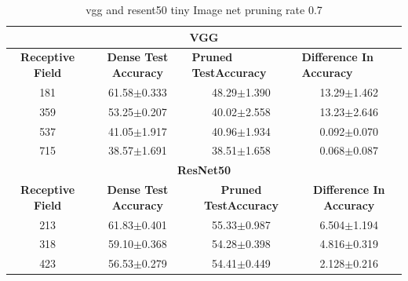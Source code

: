 \begin{table}[]
\begin{tabular}{@{}cccc@{}}
\toprule
\multicolumn{4}{c}{\textbf{VGG}}                                                                                                                                  \\ \midrule
\textbf{Receptive Field} & \textbf{Dense Test Accuracy} & \multicolumn{1}{l}{\textbf{Pruned  TestAccuracy}} & \multicolumn{1}{l}{\textbf{Difference In Accuracy}} \\ \midrule
181                      & 61.58$\pm$0.333              & 48.29$\pm$1.390                                   & 13.29$\pm$1.462                                     \\
359                      & 53.25$\pm$0.207              & 40.02$\pm$2.558                                   & 13.23$\pm$2.646                                     \\
537                      & 41.05$\pm$1.917              & 40.96$\pm$1.934                                   & 0.092$\pm$0.070                                     \\
715                      & 38.57$\pm$1.691              & 38.51$\pm$1.658                                   & 0.068$\pm$0.087                                     \\ \midrule
\multicolumn{4}{c}{\textbf{ResNet50}}                                                                                                                             \\ \midrule
\textbf{Receptive Field} & \textbf{Dense Test Accuracy} & \textbf{Pruned  TestAccuracy}                     & \textbf{Difference In Accuracy}                     \\
213                      & 61.83$\pm$0.401              & 55.33$\pm$0.987                                   & 6.504$\pm$1.194                                     \\
318                      & 59.10$\pm$0.368              & 54.28$\pm$0.398                                   & 4.816$\pm$0.319                                     \\
423                      & 56.53$\pm$0.279              & 54.41$\pm$0.449                                   & 2.128$\pm$0.216                                     \\ \bottomrule
\end{tabular}
\caption{vgg and resent50 tiny Image net pruning rate 0.7}
\label{tab:tiny imagenet pruning rate07}
\end{table}
